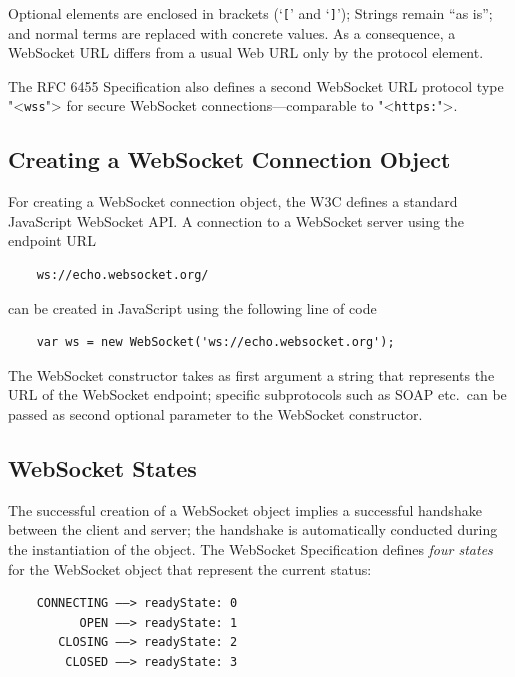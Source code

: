 \documentclass[a4paper, justified, notoc]{tufte-handout} %
\begin{document}
Optional elements are enclosed in brackets (`\texttt{[}' and `\texttt{]}'); Strings remain ``as is''; and normal terms are replaced with concrete values. As a consequence, a WebSocket URL differs from a usual Web URL only by the protocol element.

The RFC 6455 Specification also defines a second WebSocket URL protocol type "<\texttt{wss}"> for secure WebSocket connections---comparable to "<\texttt{https:}">.

\subsection{Creating a WebSocket Connection Object} %
\label{sub:creating_a_websocket_connection_object}

For creating a WebSocket connection object, the W3C defines a standard JavaScript WebSocket API. A connection to a WebSocket server using the endpoint URL 
\begin{Verbatim}
	ws://echo.websocket.org/
\end{Verbatim}
can be created in JavaScript using the following line of code
\begin{Verbatim}
	var ws = new WebSocket('ws://echo.websocket.org');
\end{Verbatim}
The WebSocket constructor takes as first argument a string that represents the URL of the WebSocket endpoint; specific subprotocols such as SOAP etc.\ can be passed as second optional parameter to the WebSocket constructor.

\subsection{WebSocket States} %
\label{sub:handling_websocket_states}

The successful creation of a WebSocket object implies a successful handshake between the client and server; the handshake is automatically conducted during the instantiation of the object. The WebSocket Specification defines \emph{four states} for the WebSocket object that represent the current status:
\begin{Verbatim}
	CONNECTING ––> readyState: 0
	      OPEN ––> readyState: 1
	   CLOSING ––> readyState: 2
	    CLOSED ––> readyState: 3	
\end{Verbatim} 
\end{document}
